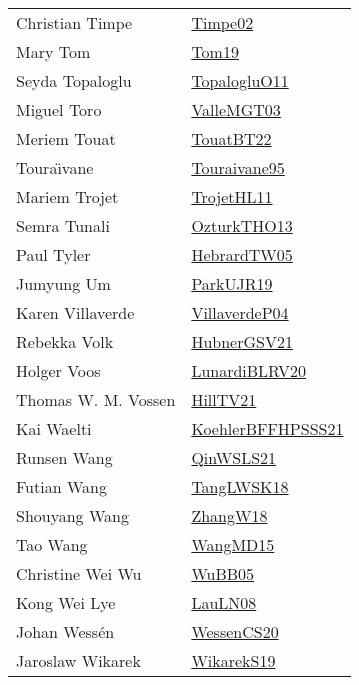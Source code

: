 {\begin{longtable}{p{4cm}p{20cm}}
Christian Timpe & \href{articles/Timpe02.pdf}{Timpe02}\cite{Timpe02} \\
Mary Tom & \href{papers/Tom19.pdf}{Tom19}\cite{Tom19} \\
Seyda Topaloglu & \href{articles/TopalogluO11.pdf}{TopalogluO11}\cite{TopalogluO11} \\
Miguel Toro & \href{papers/ValleMGT03.pdf}{ValleMGT03}\cite{ValleMGT03} \\
Meriem Touat & \href{papers/TouatBT22.pdf}{TouatBT22}\cite{TouatBT22} \\
Toura{\"{\i}}vane & \href{papers/Touraivane95.pdf}{Touraivane95}\cite{Touraivane95} \\
Mariem Trojet & \href{articles/TrojetHL11.pdf}{TrojetHL11}\cite{TrojetHL11} \\
Semra Tunali & \href{articles/OzturkTHO13.pdf}{OzturkTHO13}\cite{OzturkTHO13} \\
Paul Tyler & \href{papers/HebrardTW05.pdf}{HebrardTW05}\cite{HebrardTW05} \\
Jumyung Um & \href{papers/ParkUJR19.pdf}{ParkUJR19}\cite{ParkUJR19} \\
Karen Villaverde & \href{}{VillaverdeP04}\cite{VillaverdeP04} \\
Rebekka Volk & \href{articles/HubnerGSV21.pdf}{HubnerGSV21}\cite{HubnerGSV21} \\
Holger Voos & \href{articles/LunardiBLRV20.pdf}{LunardiBLRV20}\cite{LunardiBLRV20} \\
Thomas W. M. Vossen & \href{papers/HillTV21.pdf}{HillTV21}\cite{HillTV21} \\
Kai Waelti & \href{articles/KoehlerBFFHPSSS21.pdf}{KoehlerBFFHPSSS21}\cite{KoehlerBFFHPSSS21} \\
Runsen Wang & \href{articles/QinWSLS21.pdf}{QinWSLS21}\cite{QinWSLS21} \\
Futian Wang & \href{}{TangLWSK18}\cite{TangLWSK18} \\
Shouyang Wang & \href{articles/ZhangW18.pdf}{ZhangW18}\cite{ZhangW18} \\
Tao Wang & \href{articles/WangMD15.pdf}{WangMD15}\cite{WangMD15} \\
Christine Wei Wu & \href{papers/WuBB05.pdf}{WuBB05}\cite{WuBB05} \\
Kong Wei Lye & \href{papers/LauLN08.pdf}{LauLN08}\cite{LauLN08} \\
Johan Wess{\'{e}}n & \href{papers/WessenCS20.pdf}{WessenCS20}\cite{WessenCS20} \\
Jaroslaw Wikarek & \href{articles/WikarekS19.pdf}{WikarekS19}\cite{WikarekS19} \\

\end{longtable}}
